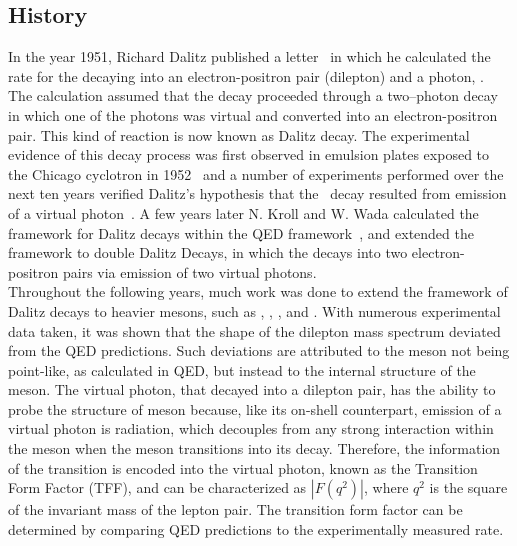 \subsection{History}
\indent In the year 1951, Richard Dalitz published a letter~\cite{Dalitz} in which he calculated the rate for the \pizT  decaying into an electron-positron pair (dilepton) and a photon, \pizDal. The calculation assumed that the decay proceeded through a two–photon decay in which one of the photons was virtual and converted into an electron-positron pair.  This kind of reaction is now known as Dalitz decay. The experimental evidence of this decay process was first observed in emulsion plates exposed to the Chicago cyclotron in 1952~\cite{Lord} and a number of experiments performed over the next ten years verified Dalitz’s hypothesis that the \pizDal \ decay resulted from emission of a virtual photon~\cite{Samios,Lindenfeld,Sargent}. A few years later N. Kroll and W. Wada calculated the framework for Dalitz decays within the QED framework~\cite{KrollWada}, and extended the framework to double Dalitz Decays, in which the \pizT decays into two electron-positron pairs via emission of two virtual photons. \\
\indent Throughout the following years, much work was done to extend the framework of Dalitz decays to heavier mesons, such as \etaT, \omT, \etaTP, and \phiT. With numerous experimental data taken, it was shown that the shape of the dilepton mass spectrum deviated from the QED predictions. Such deviations are attributed to the meson not being point-like, as calculated in QED, but instead to the internal structure of the meson. The virtual photon, that decayed into a dilepton pair, has the ability to probe the structure of meson because, like its on-shell counterpart, emission of a  virtual photon is radiation, which decouples from any strong interaction within the meson when the meson transitions into its decay. Therefore, the information of the transition is encoded into the virtual photon, known as the Transition Form Factor (TFF), and can be characterized as $\left| F(q^2)\right|$, where $q^2$ is the square of the invariant mass of the lepton pair.  The transition form factor can be determined by comparing QED predictions to the experimentally measured rate.

